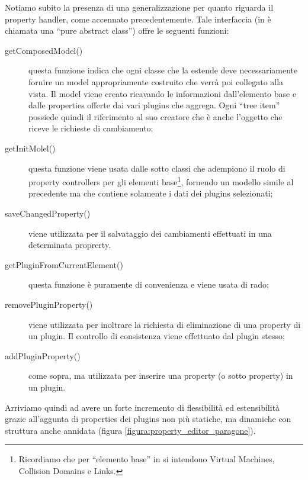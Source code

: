 Notiamo subito la presenza di una generalizzazione per quanto riguarda il property handler, come accennato precedentemente. Tale interfaccia (in \cpp{} è chiamata una ``pure abstract class'') offre le seguenti funzioni:
\begin{description}
\item[getComposedModel()]questa funzione indica che ogni classe che la estende deve necessariamente fornire un model appropriamente costruito che verrà poi collegato alla vista. Il model viene creato ricavando le informazioni dall'elemento base e dalle properties offerte dai vari plugins che aggrega. Ogni ``tree item'' possiede quindi il riferimento al suo creatore che è anche l'oggetto che riceve le richieste di cambiamento;

\item[getInitMolel()]questa funzione viene usata dalle sotto classi che adempiono il ruolo di property controllers per gli elementi base\footnote{Ricordiamo che per ``elemento base'' in \visualnetkit{} si intendono Virtual Machines, Collision Domains e Links.}, fornendo un modello simile al precedente ma che contiene solamente i dati dei plugins selezionati;

\item[saveChangedProperty()]viene utilizzata per il salvataggio dei cambiamenti effettuati in una determinata proprerty.

\item[getPluginFromCurrentElement()]questa funzione è puramente di convenienza e viene usata di rado;

\item[removePluginProperty()]viene utilizzata per inoltrare la richiesta di eliminazione di una property di un plugin. Il controllo di consistenza viene effettuato dal plugin stesso;

\item[addPluginProperty()]come sopra, ma utilizzata per inserire una property (o sotto property) in un plugin.
\end{description}

Arriviamo quindi ad avere un forte incremento di flessibilità ed estensibilità grazie all'aggunta di properties dei plugins non più statiche, ma dinamiche con struttura anche annidata (figura \ref{figura:property_editor_paragone}).

